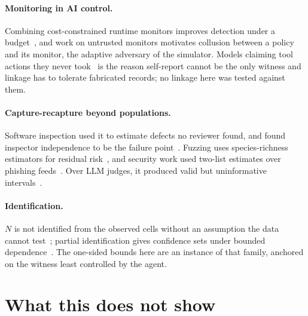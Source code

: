 \documentclass[11pt]{article}
\begin{document}
\paragraph{Monitoring in AI control.} Combining cost-constrained runtime monitors
improves detection under a budget~\citep{hua2025monitors}, and work on untrusted
monitors motivates collusion between a policy and its monitor, the adaptive
adversary of the simulator. Models claiming tool actions they never
took~\citep{transluce2025o3} is the reason self-report cannot be the only witness
and linkage has to tolerate fabricated records; no linkage here was tested
against them.

\paragraph{Capture-recapture beyond populations.} Software inspection used it to
estimate defects no reviewer found, and found inspector independence to be the
failure point~\citep{eick1992inspection,petersson2004inspection}. Fuzzing uses
species-richness estimators for residual risk~\citep{bohme2018stads}, and security
work used two-list estimates over phishing feeds~\citep{moore2007phish}. Over LLM
judges, it produced valid but uninformative intervals~\citep{kansal2026labels}.

\paragraph{Identification.} $N$ is not identified from the observed cells without
an assumption the data cannot test~\citep{aleshinguendel2024}; partial
identification gives confidence sets under bounded
dependence~\citep{sun2020bounds,dulcerubio2024}. The one-sided bounds here are an
instance of that family, anchored on the witness least controlled by the agent.

\section{What this does not show}
\label{sec:limits}
\end{document}
